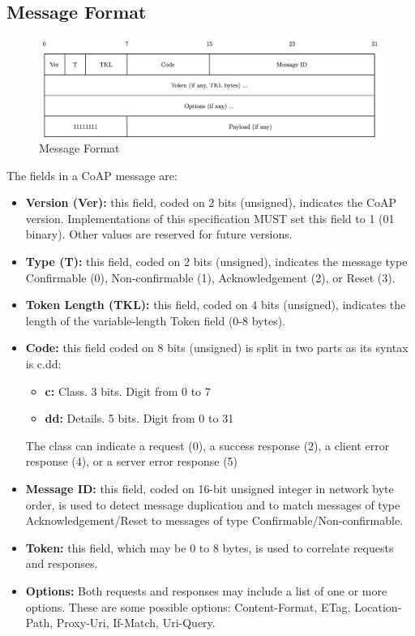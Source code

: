 \documentclass[11pt]{book}
\begin{document}
\subsection{Message Format}
\begin{figure}[H]
	\centering
	\includegraphics [scale=0.175] {messageformat.png}
	\caption{Message Format}
\end{figure}
The fields in a CoAP message are:
\begin{itemize}
\item \textbf{Version (Ver):} this field, coded on 2 bits (unsigned), indicates the CoAP version. Implementations of this specification MUST set this field to 1 (01 binary).  Other values are reserved for future versions. 
\item \textbf{Type (T):} this field, coded on 2 bits (unsigned), indicates the message type Confirmable (0), Non-confirmable (1), Acknowledgement (2), or Reset (3).
\item \textbf{Token Length (TKL):} this field, coded on 4 bits (unsigned), indicates the length of the variable-length Token field (0-8 bytes). 
\item \textbf{Code:} this field coded on 8 bits (unsigned) is split in two parts as its syntax is c.dd:
	\begin{itemize}
	\item \textbf{c:} Class. 3 bits. Digit from 0 to 7
	\item \textbf{dd:} Details. 5 bits. Digit from 0 to 31
	\end{itemize}
The class can indicate a request (0), a success response (2), a client error response (4), or a server error response (5)
\item \textbf{Message ID:} this field, coded on 16-bit unsigned integer in network byte order, is used to detect message duplication and to match messages of type Acknowledgement/Reset to messages of type Confirmable/Non-confirmable.
\item \textbf{Token:}  this field, which may be 0 to 8 bytes, is used to correlate requests and responses.
\item \textbf{Options:} Both requests and responses may include a list of one or more options. These are some possible options: Content-Format, ETag, Location-Path, Proxy-Uri, If-Match, Uri-Query.
\end{itemize}
\end{document}

